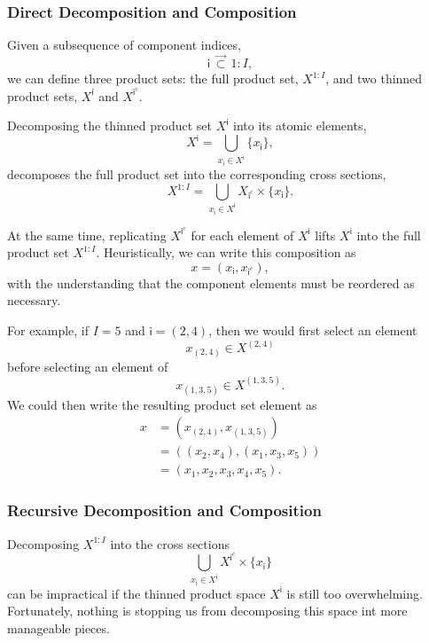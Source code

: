 \documentclass[
  letterpaper,
  DIV=11,
  numbers=noendperiod]{scrartcl}
\begin{document}
\subsubsection{Direct Decomposition and
Composition}\label{direct-decomposition-and-composition}

Given a subsequence of component indices, \[
\mathsf{i} \, \vec{\subset} \, 1:I,
\] we can define three product sets: the full product set, \(X^{1:I}\),
and two thinned product sets, \(X^{ \mathsf{i} }\) and
\(X^{ \mathsf{i}^{c} }\).

Decomposing the thinned product set \(X^{ \mathsf{i} }\) into its atomic
elements, \[
X^{ \mathsf{i} }
=
\bigcup_{ x_{ \mathsf{i} } \in X^{ \mathsf{i} } }
\{ x_{ \mathsf{i} } \},
\] decomposes the full product set into the corresponding cross
sections, \[
X^{1:I}
=
\bigcup_{ x_{ \mathsf{i} } \in X^{ \mathsf{i} } }
X_{ \mathsf{i}^{c} }\times \{ x_{ \mathsf{i} } \}.
\]

At the same time, replicating \(X^{ \mathsf{i}^{c} }\) for each element
of \(X^{ \mathsf{i} }\) lifts \(X^{ \mathsf{i} }\) into the full product
set \(X^{1:I}\). Heuristically, we can write this composition as \[
x = ( x_{ \mathsf{i} }, x_{ \mathsf{i}^{c} } ),
\] with the understanding that the component elements must be reordered
as necessary.

For example, if \(I = 5\) and \(\mathsf{i} = (2, 4)\), then we would
first select an element \[
x_{ (2, 4) } \in X^{ (2, 4) }
\] before selecting an element of \[
x_{ (1, 3, 5) } \in X^{ (1, 3, 5) }.
\] We could then write the resulting product set element as
\begin{align*}
x
&=
( x_{ (2, 4) }, x_{ (1, 3, 5) }  )
\\
&=
( (x_{2}, x_{4}), ( x_{1}, x_{3}, x_{5}) )
\\
&=
( x_{1}, x_{2}, x_{3}, x_{4}, x_{5} ).
\end{align*}

\subsubsection{Recursive Decomposition and
Composition}\label{recursive-decomposition-and-composition}

Decomposing \(X^{1:I}\) into the cross sections \[
\bigcup_{ x_{ \mathsf{i} } \in X^{ \mathsf{i} } }
X^{ \mathsf{i}^{c} }\times \{ x_{ \mathsf{i} } \}
\] can be impractical if the thinned product space \(X^{ \mathsf{i} }\)
is still too overwhelming. Fortunately, nothing is stopping us from
decomposing this space int more manageable pieces.
\end{document}
